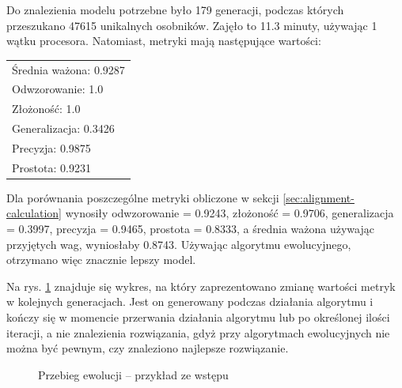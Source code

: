 Do znalezienia modelu potrzebne było 179 generacji, podczas których przeszukano 47615 unikalnych osobników. Zajęło to 11.3 minuty, używając 1 wątku procesora. Natomiast, metryki mają następujące wartości: 

 \begin{center}
  \begin{tabular}{l}
	Średnia ważona: 0.9287 \\
	Odwzorowanie: 1.0 \\
	Złożoność: 1.0 \\
	Generalizacja: 0.3426 \\
	Precyzja: 0.9875 \\
	Prostota: 0.9231
  \end{tabular}
 \end{center}

Dla porównania poszczególne metryki obliczone w sekcji \ref{sec:alignment-calculation} wynosiły odwzorowanie = 0.9243, złożoność = 0.9706, generalizacja = 0.3997, precyzja = 0.9465, prostota = 0.8333, a średnia ważona używając przyjętych wag, wyniosłaby 0.8743. Używając algorytmu ewolucyjnego, otrzymano więc znacznie lepszy model.

Na rys. \ref{fig:p1_chart} znajduje się wykres, na który zaprezentowano zmianę wartości metryk w kolejnych generacjach. Jest on generowany podczas działania algorytmu i kończy się w momencie przerwania działania algorytmu lub po określonej ilości iteracji, a nie znalezienia rozwiązania, gdyż przy algorytmach ewolucyjnych nie można być pewnym, czy znaleziono najlepsze rozwiązanie.
\begin{figure}[!ht]
	\caption{\label{fig:p1_chart}Przebieg ewolucji -- przykład ze wstępu}
\end{figure}
\clearpage

